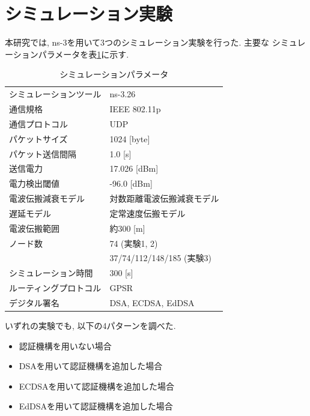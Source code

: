 \documentclass[a4j,9pt,twocolumn]{jsarticle}
\begin{document}
\section{シミュレーション実験}
本研究では, ns-3を用いて3つのシミュレーション実験を行った. 主要な
シミュレーションパラメータを表\ref{tab:parameter}に示す. 
\begin{table}[h]
  \centering
  \caption{シミュレーションパラメータ}
  \label{tab:parameter}
  \begin{tabular}{ll} \hline
    シミュレーションツール & ns-3.26 \\
    通信規格 & IEEE 802.11p \\
    通信プロトコル & UDP \\
    パケットサイズ & 1024 [byte] \\
    パケット送信間隔 & 1.0 [s] \\
    送信電力 & 17.026 [dBm] \\
    電力検出閾値 & -96.0 [dBm] \\
    電波伝搬減衰モデル & 対数距離電波伝搬減衰モデル \\
    遅延モデル & 定常速度伝搬モデル \\
    電波伝搬範囲 & 約300 [m] \\
    ノード数 & 74 (実験1, 2)\\
    & 37/74/112/148/185 (実験3) \\
    シミュレーション時間 & 300 [s] \\
    ルーティングプロトコル & GPSR \\
    デジタル署名 & DSA, ECDSA, EdDSA \\ \hline
  \end{tabular}
\end{table}

\indent いずれの実験でも, 以下の4パターンを調べた. 
\begin{itemize}
    \item 認証機構を用いない場合
    \item DSAを用いて認証機構を追加した場合
    \item ECDSAを用いて認証機構を追加した場合
    \item EdDSAを用いて認証機構を追加した場合
\end{itemize}
\end{document}
